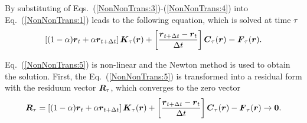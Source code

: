\documentclass[a4paper]{article}
\newcommand{\mbf}[1]{\mbox{\boldmath$#1$}}
\newcommand{\del}[2]{\mbox{$\displaystyle\frac{#1}{#2}$}}
\newcommand{\refeq}[1]{Eq.~(\ref{#1})}
\newcommand{\refeqsr}[2]{\mbox{Eqs.~(\ref{#1})-(\ref{#2})}}
\begin{document}
By substituting of \refeqsr{NonNonTrans:3}{NonNonTrans:4} into \refeq{NonNonTrans:1} leads to the following equation, which is solved at time $\tau$
\begin{equation}
\left[(1-\alpha)\mbf{r}_t + \alpha\mbf{r}_{t+\Delta t} \right] \mbf{K}_{\tau}(\mbf{r}) +
\left[\del{\mbf{r}_{t+\Delta t}-\mbf{r}_t}{\Delta t}\right] \mbf{C}_{\tau}(\mbf{r}) = 
\mbf{F}_{\tau}(\mbf{r}).\label{NonNonTrans:5}
\end{equation}

\refeq{NonNonTrans:5} is non-linear and the Newton method is used to obtain the solution. First, the \refeq{NonNonTrans:5} is 
transformed into a residual form with the residuum vector $\mbf{R}_{\tau}$, which converges to the zero vector
\begin{equation}
\mbf{R}_{\tau} = 
\left[(1-\alpha)\mbf{r}_t + \alpha\mbf{r}_{t+\Delta t} \right] \mbf{K}_{\tau}(\mbf{r}) +
\left[\del{\mbf{r}_{t+\Delta t}-\mbf{r}_t}{\Delta t}\right] \mbf{C}_{\tau}(\mbf{r}) -
\mbf{F}_{\tau}(\mbf{r}) \to \mbf{0}.\label{NonNonTrans:6}
\end{equation}
\end{document}
